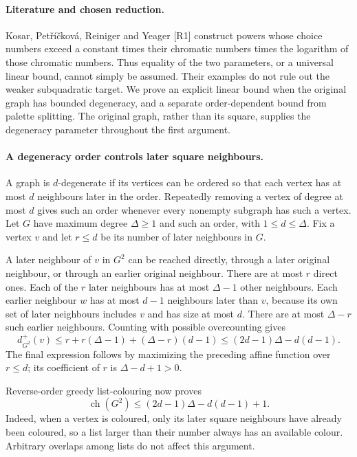 \documentclass[11pt,a4paper]{article}
\begin{document}
\paragraph{Literature and chosen reduction.}
Kosar, Pet\v r\'i\v ckov\'a, Reiniger and Yeager [R1] construct
powers whose choice numbers exceed a constant times their chromatic
numbers times the logarithm of those chromatic numbers. Thus equality
of the two parameters, or a universal linear bound, cannot simply be
assumed. Their examples do not rule out the weaker subquadratic target.
We prove an explicit linear bound when the original graph has bounded
degeneracy, and a separate order-dependent bound from palette splitting.
The original graph, rather than its square, supplies the degeneracy
parameter throughout the first argument.

\paragraph{A degeneracy order controls later square neighbours.}
A graph is $d$-degenerate if its vertices can be ordered so that
each vertex has at most $d$ neighbours later in the order. Repeatedly
removing a vertex of degree at most $d$ gives such an order whenever
every nonempty subgraph has such a vertex. Let $G$ have maximum
degree $\Delta\ge1$ and such an order, with $1\le d\le\Delta$.
Fix a vertex $v$ and let $r\le d$ be its number of later
neighbours in $G$.

A later neighbour of $v$ in $G^2$ can be reached directly, through
a later original neighbour, or through an earlier original neighbour.
There are at most $r$ direct ones. Each of the $r$ later neighbours
has at most $\Delta-1$ other neighbours. Each earlier neighbour $w$
has at most $d-1$ neighbours later than $v$, because its own set
of later neighbours includes $v$ and has size at most $d$.
There are at most $\Delta-r$ such earlier neighbours. Counting with
possible overcounting gives
\[
 d^+_{G^2}(v)\le r+r(\Delta-1)+(\Delta-r)(d-1)
 \le(2d-1)\Delta-d(d-1).
\]
The final expression follows by maximizing the preceding affine
function over $r\le d$; its coefficient of $r$ is
$\Delta-d+1>0$.

Reverse-order greedy list-colouring now proves
\[
 \operatorname{ch}(G^2)\le(2d-1)\Delta-d(d-1)+1.
\]
Indeed, when a vertex is coloured, only its later square neighbours
have already been coloured, so a list larger than their number always
has an available colour. Arbitrary overlaps among lists do not affect
this argument.
\end{document}

